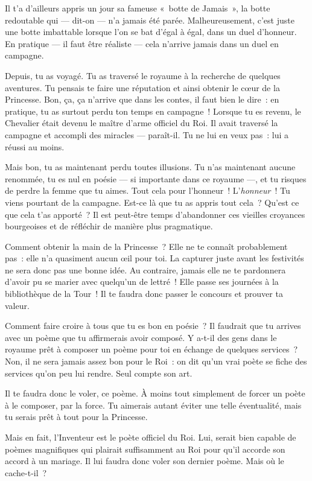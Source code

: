{{Il t’a d’ailleurs appris un jour sa fameuse «~botte de Jamais~», la botte redoutable qui — dit-on — n’a jamais été parée.
Malheureusement, c’est juste une botte imbattable lorsque l’on se bat d’égal à égal, dans un duel d’honneur.
En pratique — il faut être réaliste — cela n’arrive jamais dans un duel en campagne.

Depuis, tu as voyagé.  Tu as traversé le royaume à la recherche de quelques aventures.
Tu pensais te faire une réputation et ainsi obtenir le cœur de la Princesse.
Bon, ça, ça n’arrive que dans les contes, il faut bien le dire~:  en pratique, tu as surtout perdu ton temps en campagne~!
Lorsque tu es revenu, le Chevalier était devenu le maître d’arme officiel du Roi.
Il avait traversé la campagne et accompli des miracles — paraît-il.
Tu ne lui en veux pas~:  lui a réussi au moins.

Mais bon, tu as maintenant perdu toutes illusions.
Tu n’as maintenant aucune renommée, tu es nul en poésie — si importante dans ce royaume —, et tu risques de perdre la femme que tu aimes.
Tout cela pour l’honneur~!
L’\emph{honneur}~!
Tu viens pourtant de la campagne.
Est-ce là que tu as appris tout cela~?
Qu’est ce que cela t’as apporté~?
Il est peut-être temps d’abandonner ces vieilles croyances bourgeoises et de réfléchir de manière plus pragmatique.

Comment obtenir la main de la Princesse~?
Elle ne te connaît probablement pas~:  elle n’a quasiment aucun œil pour toi.
La capturer juste avant les festivités ne sera donc pas une bonne idée.
Au contraire, jamais elle ne te pardonnera d’avoir pu se marier avec quelqu’un de lettré~!
Elle passe ses journées à la bibliothèque de la Tour~!
Il te faudra donc passer le concours et prouver ta valeur.

Comment faire croire à tous que tu es bon en poésie~?
Il faudrait que tu arrives avec un poème que tu affirmerais avoir composé.
Y a-t-il des gens dans le royaume prêt à composer un poème pour toi en échange de quelques services~?
Non, il ne sera jamais assez bon pour le Roi~:  on dit qu’un vrai poète se fiche des services qu’on peu lui rendre.
Seul compte son art.

Il te faudra donc le voler, ce poème.
À moins tout simplement de forcer un poète à le composer, par la force.
Tu aimerais autant éviter une telle éventualité, mais tu serais prêt à tout pour la Princesse.

Mais en fait, l’Inventeur est le poète officiel du Roi.
Lui, serait bien capable de poèmes magnifiques qui plairait suffisamment au Roi pour qu’il accorde son accord à un mariage.
Il lui faudra donc voler son dernier poème.
Mais où le cache-t-il~?
}

}

